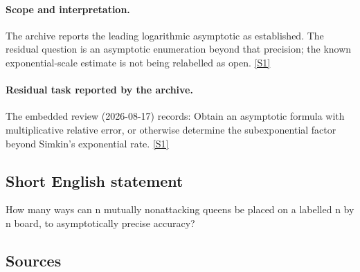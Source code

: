 \documentclass[11pt,a4paper]{article}
\newcommand{\sref}[2]{\hyperlink{source:#1:#2}{[S#2]}}
\begin{document}
\paragraph{Scope and interpretation.}

The archive reports the leading logarithmic asymptotic as established. The residual question is an asymptotic enumeration beyond that precision; the known exponential-scale estimate is not being relabelled as open. \sref{1097}{1}

\paragraph{Residual task reported by the archive.}

The embedded review (2026-08-17) records: Obtain an asymptotic formula with multiplicative relative error, or otherwise determine the subexponential factor beyond Simkin's exponential rate. \sref{1097}{1}

\subsection{Short English statement}

How many ways can n mutually nonattacking queens be placed on a labelled n by n board, to asymptotically precise accuracy?

\subsection{Sources}
\end{document}

